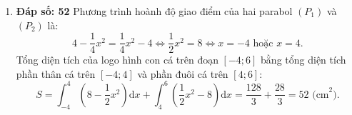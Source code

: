 \documentclass[12pt,a4paper]{article}
\begin{document}
\begin{enumerate}[label=\textbf{Câu \arabic*:}, leftmargin=*]
\item \textbf{Đáp số: 52}
Phương trình hoành độ giao điểm của hai parabol $(P_1)$ và $(P_2)$ là:
$$4 - \dfrac{1}{4}x^2 = \dfrac{1}{4}x^2 - 4 \iff \dfrac{1}{2}x^2 = 8 \iff x = -4 \text{ hoặc } x = 4.$$
Tổng diện tích của logo hình con cá trên đoạn $[-4; 6]$ bằng tổng diện tích phần thân cá trên $[-4; 4]$ và phần đuôi cá trên $[4; 6]$:
$$S = \int_{-4}^{4} \left(8 - \dfrac{1}{2}x^2\right)\mathrm{d}x + \int_{4}^{6} \left(\dfrac{1}{2}x^2 - 8\right)\mathrm{d}x = \dfrac{128}{3} + \dfrac{28}{3} = 52\text{ (cm}^2).$$

\end{enumerate}
\end{document}
